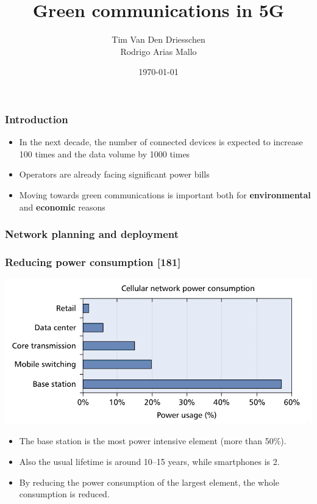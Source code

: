 \documentclass[a4paper,11pt,handout]{beamer}
\title{Green communications in 5G}
\author{Tim Van Den Driesschen\\Rodrigo Arias Mallo}
\institute{Universitat Politècnica de Catalunya}
\date{\today}
\begin{document}
\begin{frame}
	\titlepage
\end{frame}
\note{}
\begin{frame}
\frametitle{Introduction}
\begin{itemize}

\item In the next decade, the number of connected devices is expected to 
increase 100 times and the data volume by 1000 times

\item Operators are already facing significant power bills

\item Moving towards green communications is important both for 
\textbf{environmental} and \textbf{economic} reasons

\end{itemize}
\end{frame}
\note{}
\begin{frame}
	\frametitle{Network planning and deployment}
\end{frame}
\note{}
\begin{frame}
\frametitle{Reducing power consumption [181]}
	\begin{center}
	\includegraphics[scale=1]{consumption.png}
	\end{center}

\begin{itemize}

	\item The base station is the most power intensive element (more than 50\%).
	\item Also the usual lifetime is around 10--15 years, while smartphones is 2.
	\item By reducing the power consumption of the largest element, the whole 
	consumption is reduced.

\end{itemize}
\end{frame}
\end{document}
